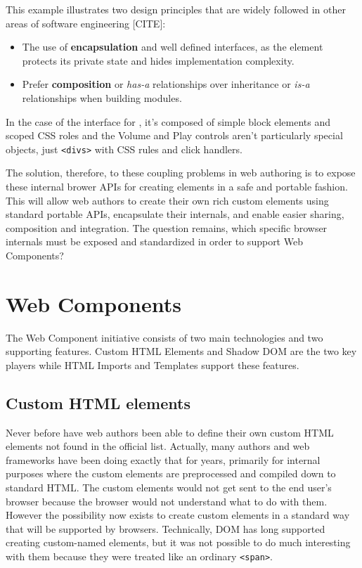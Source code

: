 This example illustrates two design principles that are widely followed in other areas of software engineering [CITE]:
\begin{itemize}
\item The use of \textbf{encapsulation} and well defined interfaces, as the  element protects its private state and hides implementation complexity.
\item Prefer \textbf{composition} or \textit{has-a} relationships over inheritance or \textit{is-a} relationships when building modules. 
\end{itemize}
In the case of the interface for , it's composed of simple block elements and scoped CSS roles and the Volume and Play controls aren't particularly special objects, just \texttt{<divs>} with CSS rules and click handlers.

The solution, therefore, to these coupling problems in web authoring is to expose these internal brower APIs for creating elements in a safe and portable fashion. 
This will allow web authors to create their own rich custom elements using standard portable APIs, encapsulate their internals, and enable easier sharing, composition and integration.
The question remains, which specific browser internals must be exposed and standardized in order to support Web Components?

\section{Web Components}

The Web Component initiative consists of two main technologies and two supporting features. 
Custom HTML Elements and Shadow DOM are the two key players while HTML Imports and Templates support these features.

\subsection{Custom HTML elements}
Never before have web authors been able to define their own custom HTML elements not found in the official list.
Actually, many authors and web frameworks have been doing exactly that for years, primarily for internal purposes where the custom elements are pre\-processed and compiled down to standard HTML.
The custom elements would not get sent to the end user's browser because the browser would not understand what to do with them.
However the possibility now exists to create custom elements in a standard way that will be supported by browsers. Technically, DOM has long supported creating custom-named elements, but it was not possible to do much interesting with them because they were treated like an ordinary \texttt{<span>}.

